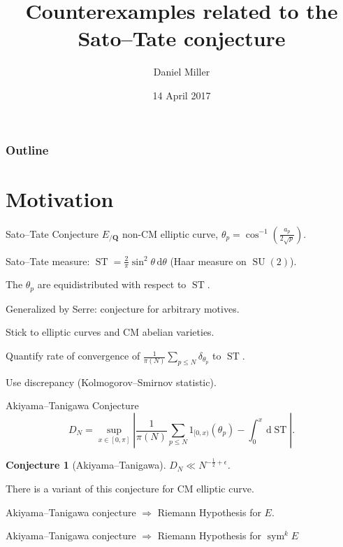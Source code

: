 \documentclass[handout]{beamer}
\title{Counterexamples related to the Sato--Tate conjecture}
\author{Daniel Miller}
\institute{Cornell University}
\date{14 April 2017}
\DeclareMathOperator{\ST}{ST}
\DeclareMathOperator{\SU}{SU}
\DeclareMathOperator{\sym}{sym}
\newcommand{\bQ}{\mathbf{Q}}
\newcommand{\dd}{\mathrm{d}}
\newtheorem{conjecture}{Conjecture}
\begin{document}
\begin{frame}
\titlepage
\end{frame}

\begin{frame}
\frametitle{Outline}
\tableofcontents
\end{frame}





\section{Motivation}

\begin{frame}{Sato--Tate Conjecture}
$E_{/\bQ}$ non-CM elliptic curve, $\theta_p = \cos^{-1}\left( \frac{a_p}{2\sqrt p}\right)$. 
\pause

Sato--Tate measure: $\ST = \frac{2}{\pi} \sin^2 \theta\, \dd \theta$ (Haar 
measure on $\SU(2)$). 
\pause

\begin{theorem}[Taylor et.~al.]
The $\theta_p$ are equidistributed with respect to $\ST$. 
\end{theorem}
\pause

Generalized by Serre: conjecture for arbitrary motives. 
\pause

Stick to elliptic curves and CM abelian varieties.
\pause

Quantify rate of convergence of 
$\frac{1}{\pi(N)} \sum_{p\leqslant N} \delta_{\theta_p}$ to $\ST$. 
\pause

Use discrepancy (Kolmogorov--Smirnov statistic). 
\end{frame}


\begin{frame}{Akiyama--Tanigawa Conjecture}
\[
	D_N = \sup_{x\in [0,\pi]}\left| \frac{1}{\pi(N)} \sum_{p\leqslant N} 1_{[0,x)}(\theta_p) - \int_0^x \, \dd\ST\right| .
\]
\pause

\begin{conjecture}[Akiyama--Tanigawa]
$D_N \ll N^{-\frac 1 2 + \epsilon}$. 
\end{conjecture}
\pause

There is a variant of this conjecture for CM elliptic curve.
\pause

\begin{theorem}
Akiyama--Tanigawa conjecture $\Rightarrow$ Riemann Hypothesis for $E$.
\end{theorem}
\pause

\begin{theorem}[Mazur]
Akiyama--Tanigawa conjecture $\Rightarrow$ Riemann Hypothesis for $\sym^k E$
\end{theorem}
\end{frame}
\end{document}
